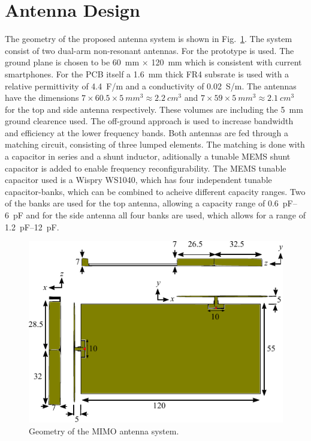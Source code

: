 \section{Antenna Design}
\label{sec:antennadesign}
The geometry of the proposed antenna system is shown in Fig.~\ref{fig:antdesign}. The system consist of two dual-arm non-resonant antennas. For the prototype  is used. The ground plane is chosen to be \SI{60}{mm} $\times$ \SI{120}{mm} which is consistent with current smartphones. For the PCB itself a \SI{1.6}{mm} thick FR4 subsrate is used with a relative permittivity of \SI{4.4}{F/m}  and a conductivity of \SI{0.02}{S/m}. The antennas have the dimensions $7 \times 60.5 \times 5\:  \si{mm^3} \approx 2.2\:  \si{cm^3} $ 
 and $7 \times 59 \times 5\:  \si{mm^3} \approx 2.1\:  \si{cm^3}$  for the top and side antenna respectively. These volumes are including the \SI{5}{mm} ground clearence used. The off-ground approach is used to increase bandwidth and efficiency at the lower frequency bands. Both antennas are fed through a matching circuit, consisting of three lumped elements. The matching is done with a capacitor in series and a shunt inductor, aditionally a tunable MEMS  shunt capacitor is added to enable frequency reconfigurability. The MEMS tunable capacitor used is a Wispry WS1040, which has four independent tunable capacitor-banks, which can be combined to acheive different capacity ranges. Two of the banks are used for the top antenna, allowing a capacity range of \SIrange{0.6}{6}{pF} and for the side antenna all four banks are used, which allows for a range of \SIrange{1.2}{12}{pF}.

\begin{figure}[t]
  \begin{center}
    \includegraphics{img/3d_drawing}
  \end{center}
  \caption{Geometry of the MIMO antenna system.}
  \label{fig:antdesign}
\end{figure}

